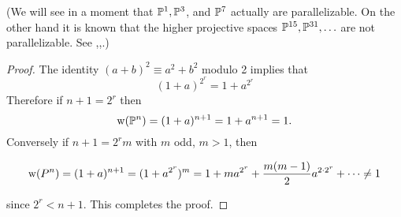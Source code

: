 \documentclass[../main]{subfiles}
\begin{document}
(We will see in a moment that $\mathbb{P}^{1}, \mathbb{P}^{3}$, and $\mathbb{P}^{7}$ actually are parallelizable. On the other hand it is known that the higher projective spaces $\mathbb{P}^{15}, \mathbb{P}^{31}, \ldots$ are not parallelizable. See \cite{bott-milnor1958},\cite{kervaire1958},\cite{adams1960}.) \label{problems page 47} %
\begin{proof}
The identity $(a+b)^{2} \equiv a^{2}+b^{2}$ modulo 2 implies that
\[
(1+a)^{2^{r}}=1+a^{2^{r}}
\]
Therefore if $n+1=2^{r}$ then
\[
\operatorname{w}(\mathbb{P}^{n})=(1+a)^{n+1}=1+a^{n+1}=1 .
\]
Conversely if $n+1=2^{r} m$ with $m$ odd, $m>1$, then

\[
 \operatorname{w}(P^{n})=(1+a)^{n+1}=(1+a^{2^{r}})^{m}  =1+m a^{2^{r}}+\frac{m(m-1)}{2} a^{2 \cdot 2^{r}}+\cdots \neq 1
\]

since $2^{r}<n+1$. This completes the proof.
\end{proof}
\end{document}
